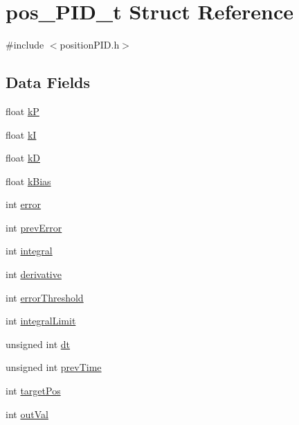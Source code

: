 \hypertarget{structpos___p_i_d__t}{}\section{pos\+\_\+\+P\+I\+D\+\_\+t Struct Reference}
\label{structpos___p_i_d__t}


{\ttfamily \#include $<$position\+P\+I\+D.\+h$>$}

\subsection*{Data Fields}
\begin{DoxyCompactItemize}
\item 
float \hyperlink{structpos___p_i_d__t_acb8e4e1f24cb049d09a3fe284a85ae0a}{kP}
\item 
float \hyperlink{structpos___p_i_d__t_a6e4c51651e2cf6d377df381902bf9598}{kI}
\item 
float \hyperlink{structpos___p_i_d__t_ad5ddba7412841756979f64dd99440372}{kD}
\item 
float \hyperlink{structpos___p_i_d__t_ac79bbf02003b6fafd07fbdef95013295}{k\+Bias}
\item 
int \hyperlink{structpos___p_i_d__t_ab919f714eb1f55dee95f5a10a1c98222}{error}
\item 
int \hyperlink{structpos___p_i_d__t_a0c962ac481b0e7486e167acde79b3c31}{prev\+Error}
\item 
int \hyperlink{structpos___p_i_d__t_a79eed86d5c4c68844e96d2f7ffa2056b}{integral}
\item 
int \hyperlink{structpos___p_i_d__t_ae1b3101729f4f3c8d9e18018a6ae9123}{derivative}
\item 
int \hyperlink{structpos___p_i_d__t_acfb7211122fb3476aa7eb3626bef614e}{error\+Threshold}
\item 
int \hyperlink{structpos___p_i_d__t_a10041e7d56b64d757c74940a2e2df3d9}{integral\+Limit}
\item 
unsigned int \hyperlink{structpos___p_i_d__t_a06051e7cc493fba042228d4ed9dea63a}{dt}
\item 
unsigned int \hyperlink{structpos___p_i_d__t_ae9da36bee552934a96a52a63b939308e}{prev\+Time}
\item 
int \hyperlink{structpos___p_i_d__t_afd2e502d5fcacb47263db803ba6a92e3}{target\+Pos}
\item 
int \hyperlink{structpos___p_i_d__t_aa62fcab2d7795f7be45683d223ca1bc9}{out\+Val}
\end{DoxyCompactItemize}


